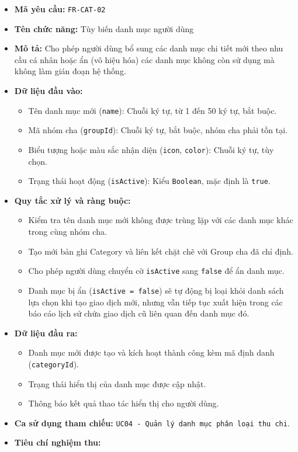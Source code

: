\documentclass[11pt,a4paper]{article}
\providecommand{\tightlist}{
  \setlength{\itemsep}{0pt}\setlength{\parskip}{0pt}}
\begin{document}
\begin{itemize}
\tightlist
\item
  \textbf{Mã yêu cầu:} \texttt{FR-CAT-02}
\item
  \textbf{Tên chức năng:} Tùy biến danh mục người dùng
\item
  \textbf{Mô tả:} Cho phép người dùng bổ sung các danh mục chi tiết mới
  theo nhu cầu cá nhân hoặc ẩn (vô hiệu hóa) các danh mục không còn sử
  dụng mà không làm gián đoạn hệ thống.
\item
  \textbf{Dữ liệu đầu vào:}

  \begin{itemize}
  \tightlist
  \item
    Tên danh mục mới (\texttt{name}): Chuỗi ký tự, từ 1 đến 50 ký tự,
    bắt buộc.
  \item
    Mã nhóm cha (\texttt{groupId}): Chuỗi ký tự, bắt buộc, nhóm cha phải
    tồn tại.
  \item
    Biểu tượng hoặc màu sắc nhận diện (\texttt{icon}, \texttt{color}):
    Chuỗi ký tự, tùy chọn.
  \item
    Trạng thái hoạt động (\texttt{isActive}): Kiểu \texttt{Boolean}, mặc
    định là \texttt{true}.
  \end{itemize}
\item
  \textbf{Quy tắc xử lý và ràng buộc:}

  \begin{itemize}
  \tightlist
  \item
    Kiểm tra tên danh mục mới không được trùng lặp với các danh mục khác
    trong cùng nhóm cha.
  \item
    Tạo mới bản ghi Category và liên kết chặt chẽ với Group cha đã chỉ
    định.
  \item
    Cho phép người dùng chuyển cờ \texttt{isActive} sang \texttt{false}
    để ẩn danh mục.
  \item
    Danh mục bị ẩn (\texttt{isActive\ =\ false}) sẽ tự động bị loại khỏi
    danh sách lựa chọn khi tạo giao dịch mới, nhưng vẫn tiếp tục xuất
    hiện trong các báo cáo lịch sử chứa giao dịch cũ liên quan đến danh
    mục đó.
  \end{itemize}
\item
  \textbf{Dữ liệu đầu ra:}

  \begin{itemize}
  \tightlist
  \item
    Danh mục mới được tạo và kích hoạt thành công kèm mã định danh
    (\texttt{categoryId}).
  \item
    Trạng thái hiển thị của danh mục được cập nhật.
  \item
    Thông báo kết quả thao tác hiển thị cho người dùng.
  \end{itemize}
\item
  \textbf{Ca sử dụng tham chiếu:}
  \texttt{UC04\ -\ Quản\ lý\ danh\ mục\ phân\ loại\ thu\ chi}.
\item
  \textbf{Tiêu chí nghiệm thu:}


\end{itemize}
\end{document}
